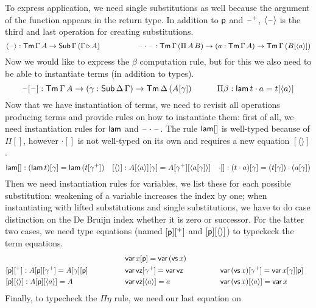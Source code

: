 \documentclass{easychair}
\begin{document}
To express application, we need single substitutions as well because
the argument of the function appears in the return type. In addition
to $\mathsf{p}$ and $\mathord{\hspace{1pt}\text{--}\hspace{1pt}}^+$, $\langle\mathord{\hspace{1pt}\text{--}\hspace{1pt}}\rangle$ is the third and last
operation for creating substitutions.
\[
\langle\mathord{\hspace{1pt}\text{--}\hspace{1pt}}\rangle : \mathsf{Tm}\,\Gamma\,A\rightarrow\mathsf{Sub}\,\Gamma\,(\Gamma\mathop{\triangleright} A) \hspace{5em} \mathord{\hspace{1pt}\text{--}\hspace{1pt}}\cdot\mathord{\hspace{1pt}\text{--}\hspace{1pt}}: \mathsf{Tm}\,\Gamma\,(\Pi\,A\,B)\rightarrow(a:\mathsf{Tm}\,\Gamma\,A)\rightarrow\mathsf{Tm}\,\Gamma\,(B[\langle a\rangle])
\]
Now we would like to express the $\beta$ computation rule, but for
this we also need to be able to instantiate terms (in addition to
types).
\[
\mathord{\hspace{1pt}\text{--}\hspace{1pt}}[\mathord{\hspace{1pt}\text{--}\hspace{1pt}}] : \mathsf{Tm}\,\Gamma\,A\rightarrow(\gamma:\mathsf{Sub}\,\Delta\,\Gamma)\rightarrow\mathsf{Tm}\,\Delta\,(A[\gamma]) \hspace{3em} \Pi\beta : \mathsf{lam}\,t\cdot a = t[\langle a\rangle] 
\]
Now that we have instantiation of terms, we need to revisit all
operations producing terms and provide rules on how to instantiate
them: first of all, we need instantiation rules for $\mathsf{lam}$ and
$\mathord{\hspace{1pt}\text{--}\hspace{1pt}}\cdot\mathord{\hspace{1pt}\text{--}\hspace{1pt}}$. The rule $\mathsf{lam}[]$ is well-typed because of
$\Pi[]$, however ${\cdot}[]$ is not well-typed on its own and requires
a new equation $[\langle\rangle]$.
\[
\mathsf{lam}[] : (\mathsf{lam}\,t)[\gamma] = \mathsf{lam}\,(t[\gamma^+]) \hspace{1em} [\langle\rangle] : A[\langle a\rangle][\gamma] = A[\gamma^+][\langle a[\gamma]\rangle] \hspace{1em} {\cdot}[] : (t\cdot a)[\gamma] = (t[\gamma])\cdot(a[\gamma])
\]
Then we need instantiation rules for variables, we list these for each
possible substitution: weakening of a variable increases the index by
one; when instantiating with lifted substitutions and single
substitutions, we have to do case distinction on the De Bruijn index
whether it is zero or successor. For the latter two cases, we need
type equations (named $[\mathsf{p}][^+]$ and $[\mathsf{p}][\langle\rangle]$) to
typeckeck the term equations.
\begin{alignat*}{10}
  & && \var\,x[\p] = \var\,(\vs\,x) \\
  & [\p][^+] : A[\p][\gamma^+] = A[\gamma][\p] \hspace{4em}&& \var\,\vz[\gamma^+] = \var\,\vz \hspace{4em} && \var\,(\vs\,x)[\gamma^+] = \var\,x[\gamma][\p] \\
  & [\p][\langle\rangle] : A[\p][\langle a\rangle] = A && \var\,\vz[\langle a\rangle] = a &&  \var\,(\vs\,x)[\langle a\rangle] = \var\,x
\end{alignat*}
Finally, to typecheck the $\Pi\eta$ rule, we need our last equation on
\end{document}
